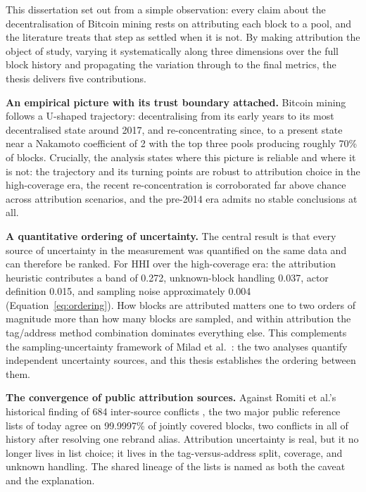 \documentclass[logo,msc]{infthesis}           %
\begin{document}
This dissertation set out from a simple observation: every claim about the
decentralisation of Bitcoin mining rests on attributing each block to a pool,
and the literature treats that step as settled when it is not. By making
attribution the object of study, varying it systematically along three
dimensions over the full block history and propagating the variation through
to the final metrics, the thesis delivers five contributions.

\textbf{An empirical picture with its trust boundary attached.} Bitcoin mining
follows a U-shaped trajectory: decentralising from its early years to its most
decentralised state around 2017, and re-concentrating since, to a present state
near a Nakamoto coefficient of 2 with the top three pools producing roughly 70\% of blocks.
Crucially, the analysis states where this picture is reliable and where it is
not: the trajectory and its turning points are robust to attribution choice in
the high-coverage era, the recent re-concentration is corroborated far above
chance across attribution scenarios, and the pre-2014 era admits no stable
conclusions at all.

\textbf{A quantitative ordering of uncertainty.} The central result is that
every source of uncertainty in the measurement was quantified on the same
data and can therefore be ranked. For HHI over the high-coverage era: the
attribution heuristic contributes a band of 0.272, unknown-block handling
0.037, actor definition 0.015, and sampling noise approximately 0.004
(Equation~\ref{eq:ordering}). How blocks are attributed matters one to two
orders of magnitude more than how many blocks are sampled, and within
attribution the tag/address method combination dominates everything else.
This complements the sampling-uncertainty framework of Milad et
al.~\cite{milad2024statistical}: the two analyses quantify independent
uncertainty sources, and this thesis establishes the ordering between them.

\textbf{The convergence of public attribution sources.} Against Romiti et
al.'s historical finding of 684 inter-source conflicts
\cite{romiti2019deep}, the two major public reference lists of today agree on
99.9997\% of jointly covered blocks, two conflicts in all of history after
resolving one rebrand alias. Attribution uncertainty is real, but it no
longer lives in list choice; it lives in the tag-versus-address split,
coverage, and unknown handling. The shared lineage of the lists is named as
both the caveat and the explanation.
\end{document}
